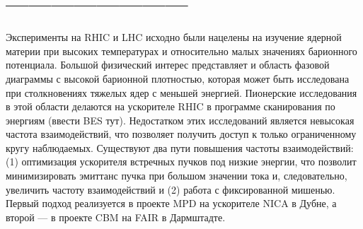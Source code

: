 







\section{------------------------}

Эксперименты на RHIC и LHC исходно были нацелены на изучение ядерной материи при высоких температурах и относительно малых значениях барионного потенциала. Большой физический интерес представляет и область фазовой диаграммы с высокой барионной плотностью, которая может быть исследована при столкновениях тяжелых ядер с меньшей энергией. Пионерские исследования в этой области делаются на ускорителе RHIC в программе сканирования по энергиям (\todo ввести BES тут). Недостатком этих исследований является невысокая частота взаимодействий, что позволяет получить доступ к только ограниченному кругу наблюдаемых. Существуют два пути повышения частоты взаимодействий: (1) оптимизация ускорителя встречных пучков под низкие энергии, что позволит минимизировать эмиттанс пучка при большом значении тока и, следовательно, увеличить частоту взаимодействий и (2) работа с фиксированной мишенью. Первый подход реализуется в проекте MPD на ускорителе NICA в Дубне, а второй --- в проекте CBM на FAIR в Дармштадте.

